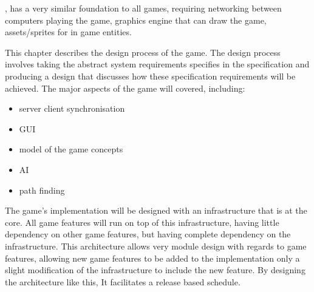 
, has a very similar foundation to all games, requiring networking between computers playing the game, graphics engine that can draw the game, assets/sprites for in game entities.


This chapter describes the design process of the game.
The design process involves taking the abstract system requirements specifies in the specification and producing a design that discusses how these specification requirements will be achieved.
The major aspects of the game will covered, including:
\begin{itemize}
\item server client synchronisation
\item GUI
\item model of the game concepts
\item AI
\item path finding
\end{itemize}

%


The game's implementation will be designed with an infrastructure that is at the core. All game features will run on top of this infrastructure, having little dependency on other game features, but having complete dependency on the infrastructure. This architecture allows very module design with regards to game features, allowing new game features to be added to the implementation only a slight modification of the infrastructure to include the new feature. By designing the architecture like this, It facilitates a release based schedule.

